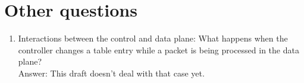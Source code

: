 \section{Other questions}
\begin{enumerate}
\item Interactions between the control and data plane: What happens when the controller changes a table entry while a packet is being processed in the data plane? \\
Answer: This draft doesn't deal with that case yet.



\end{enumerate}
